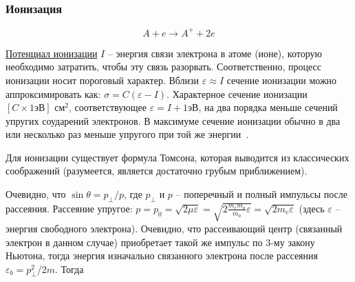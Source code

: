 \documentclass[10pt, a4paper]{article}
\begin{document}
\subsubsection{Ионизация}

\begin{equation}
	A + e \rightarrow A^{+} + 2e
\end{equation}

\uline{Потенциал ионизации} $I$ -- энергия связи электрона в атоме (ионе), которую необходимо затратить, чтобы эту связь разорвать. Соответственно, процесс ионизации носит пороговый характер. Вблизи $\varepsilon \approx I$ сечение ионизации можно аппроксимировать как: $\sigma = C(\varepsilon-I)$. Характерное сечение ионизации $[C\times1 \text{эВ}]$ см$^2$, соответствующее $\varepsilon = I + 1\text{эВ}$, на два порядка
меньше сечений упругих соударений электронов. В максимуме сечение ионизации обычно в два или несколько раз меньше упругого при той же энергии~\cite{raizer}.

Для ионизации существует формула Томсона, которая выводится из классических соображений (разумеется, является достаточно грубым приближением). 

%
%
%
%

Очевидно, что $\sin\theta = p_\perp/p$, где $p_\perp$ и $p$ -- поперечный и полный импульсы после рассеяния. Рассеяние упругое: $p = p_0 = \sqrt{2\mu\varepsilon}=\sqrt{2\frac{m_em_a}{m_a}\varepsilon} = \sqrt{2m_e\varepsilon}$ (здесь $\varepsilon$ -- энергия свободного электрона). Очевидно, что рассеивающий центр (связанный электрон в данном случае) приобретает такой же импульс по 3-му закону Ньютона, тогда энергия изначально связанного электрона после рассеяния $\varepsilon_b=p_\perp^2/2m$. Тогда
\end{document}
